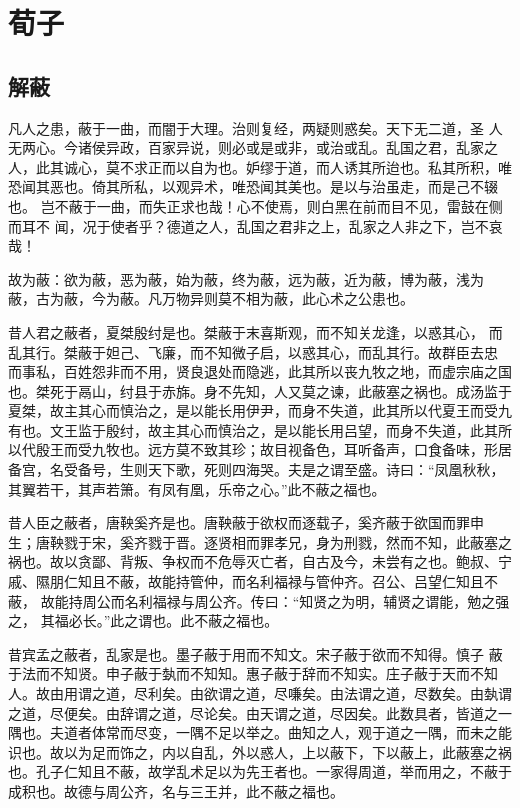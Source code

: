 \section{荀子}

\subsection{解蔽}

凡人之患，蔽于一曲，而闇于大理。治则复经，两疑则惑矣。天下无二道，圣 人无两心。今诸侯异政，百家异说，则必或是或非，或治或乱。乱国之君，乱家之 人，此其诚心，莫不求正而以自为也。妒缪于道，而人诱其所迨也。私其所积，唯 恐闻其恶也。倚其所私，以观异术，唯恐闻其美也。是以与治虽走，而是己不辍也。 岂不蔽于一曲，而失正求也哉！心不使焉，则白黑在前而目不见，雷鼓在侧而耳不 闻，况于使者乎？德道之人，乱国之君非之上，乱家之人非之下，岂不哀哉！

故为蔽：欲为蔽，恶为蔽，始为蔽，终为蔽，远为蔽，近为蔽，博为蔽，浅为 蔽，古为蔽，今为蔽。凡万物异则莫不相为蔽，此心术之公患也。

昔人君之蔽者，夏桀殷纣是也。桀蔽于末喜斯观，而不知关龙逢，以惑其心， 而乱其行。桀蔽于妲己、飞廉，而不知微子启，以惑其心，而乱其行。故群臣去忠 而事私，百姓怨非而不用，贤良退处而隐逃，此其所以丧九牧之地，而虚宗庙之国 也。桀死于鬲山，纣县于赤旆。身不先知，人又莫之谏，此蔽塞之祸也。成汤监于 夏桀，故主其心而慎治之，是以能长用伊尹，而身不失道，此其所以代夏王而受九 有也。文王监于殷纣，故主其心而慎治之，是以能长用吕望，而身不失道，此其所 以代殷王而受九牧也。远方莫不致其珍；故目视备色，耳听备声，口食备味，形居 备宫，名受备号，生则天下歌，死则四海哭。夫是之谓至盛。诗曰：“凤凰秋秋， 其翼若干，其声若箫。有凤有凰，乐帝之心。”此不蔽之福也。

昔人臣之蔽者，唐鞅奚齐是也。唐鞅蔽于欲权而逐载子，奚齐蔽于欲国而罪申 生；唐鞅戮于宋，奚齐戮于晋。逐贤相而罪孝兄，身为刑戮，然而不知，此蔽塞之 祸也。故以贪鄙、背叛、争权而不危辱灭亡者，自古及今，未尝有之也。鲍叔、宁 戚、隰朋仁知且不蔽，故能持管仲，而名利福禄与管仲齐。召公、吕望仁知且不蔽， 故能持周公而名利福禄与周公齐。传曰：“知贤之为明，辅贤之谓能，勉之强之， 其福必长。”此之谓也。此不蔽之福也。

昔宾孟之蔽者，乱家是也。墨子蔽于用而不知文。宋子蔽于欲而不知得。慎子 蔽于法而不知贤。申子蔽于埶而不知知。惠子蔽于辞而不知实。庄子蔽于天而不知 人。故由用谓之道，尽利矣。由欲谓之道，尽嗛矣。由法谓之道，尽数矣。由埶谓 之道，尽便矣。由辞谓之道，尽论矣。由天谓之道，尽因矣。此数具者，皆道之一 隅也。夫道者体常而尽变，一隅不足以举之。曲知之人，观于道之一隅，而未之能 识也。故以为足而饰之，内以自乱，外以惑人，上以蔽下，下以蔽上，此蔽塞之祸 也。孔子仁知且不蔽，故学乱术足以为先王者也。一家得周道，举而用之，不蔽于 成积也。故德与周公齐，名与三王并，此不蔽之福也。

